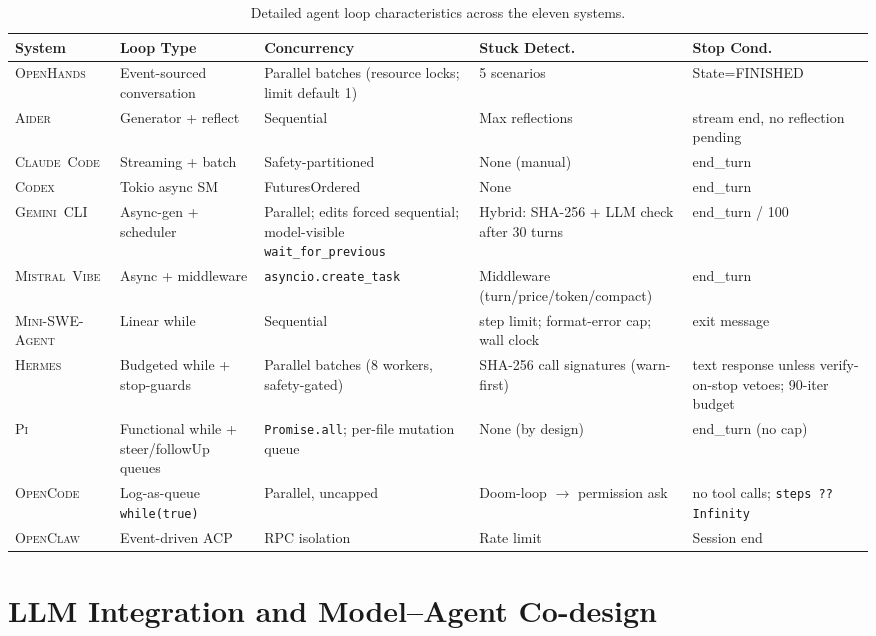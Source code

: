 \documentclass[11pt,a4paper]{article}
\newcommand{\clcode}{\textsc{Claude~Code}\xspace}
\newcommand{\cdx}{\textsc{Codex}\xspace}
\newcommand{\oh}{\textsc{OpenHands}\xspace}
\newcommand{\adr}{\textsc{Aider}\xspace}
\newcommand{\mswe}{\textsc{Mini-SWE-Agent}\xspace}
\newcommand{\ocl}{\textsc{OpenClaw}\xspace}
\newcommand{\vibe}{\textsc{Mistral~Vibe}\xspace}
\newcommand{\gemini}{\textsc{Gemini~CLI}\xspace}
\newcommand{\hrm}{\textsc{Hermes}\xspace}
\newcommand{\pib}{\textsc{Pi}\xspace}
\newcommand{\ocd}{\textsc{OpenCode}\xspace}
\begin{document}
\begin{table}[H]
\centering
\caption{Detailed agent loop characteristics across the eleven systems.}
\label{tab:loop_detail}
\small
\renewcommand{\arraystretch}{1.2}
\begin{tabularx}{\textwidth}{@{}l L{2.9cm} L{3.1cm} L{3.1cm} L{2.9cm}@{}}
\toprule
\textbf{System} & \textbf{Loop Type} & \textbf{Concurrency} & \textbf{Stuck Detect.} & \textbf{Stop Cond.} \\
\midrule
\oh{}     & Event-sourced conversation & Parallel batches (resource locks; limit default 1) & 5 scenarios & State=FINISHED  \\
\adr{}    & Generator + reflect   & Sequential          & Max reflections & stream end, no reflection pending \\
\clcode{} & Streaming + batch     & Safety-partitioned  & None (manual)   & end\_turn        \\
\cdx{}    & Tokio async SM        & FuturesOrdered      & None            & end\_turn        \\
\gemini{} & Async-gen + scheduler & Parallel; edits forced sequential; model-visible \texttt{wait\_for\_previous} & Hybrid: SHA-256 + LLM check after 30 turns & end\_turn / 100  \\
\vibe{}   & Async + middleware    & \texttt{asyncio.create\_task} & Middleware (turn/price/token/compact) & end\_turn \\
\mswe{}   & Linear while          & Sequential          & step limit; format-error cap; wall clock & exit message     \\
\hrm{}    & Budgeted while + stop-guards & Parallel batches (8 workers, safety-gated) & SHA-256 call signatures (warn-first) & text response unless verify-on-stop vetoes; 90-iter budget \\
\pib{}    & Functional while + steer/followUp queues & \texttt{Promise.all}; per-file mutation queue & None (by design) & end\_turn (no cap) \\
\ocd{}    & Log-as-queue \texttt{while(true)} & Parallel, uncapped & Doom-loop $\to$ permission ask & no tool calls; \texttt{steps ?? Infinity} \\
\ocl{}    & Event-driven ACP      & RPC isolation       & Rate limit      & Session end      \\
\bottomrule
\end{tabularx}
\end{table}

\section{LLM Integration and Model--Agent Co-design}
\label{sec:llm}
\end{document}
